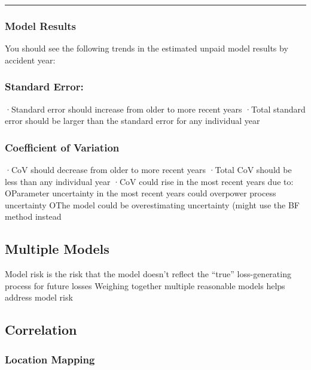 \documentclass[
]{article}
\begin{document}
\begin{center}\rule{0.5\linewidth}{0.5pt}\end{center}

\subsubsection{Model Results}\label{model-results}

You should see the following trends in the estimated unpaid model
results by accident year:

\subsubsection{Standard Error:}\label{standard-error}

·Standard error should increase from older to more recent years ·Total
standard error should be larger than the standard error for any
individual year

\subsubsection{Coefficient of Variation}\label{coefficient-of-variation}

·CoV should decrease from older to more recent years ·Total CoV should
be less than any individual year ·CoV could rise in the most recent
years due to: OParameter uncertainty in the most recent years could
overpower process uncertainty OThe model could be overestimating
uncertainty (might use the BF method instead

\subsection{Multiple Models}\label{multiple-models}

Model risk is the risk that the model doesn't reflect the ``true''
loss-generating process for future losses Weighing together multiple
reasonable models helps address model risk

\subsection{Correlation}\label{correlation}

\subsubsection{Location Mapping}\label{location-mapping}
\end{document}
